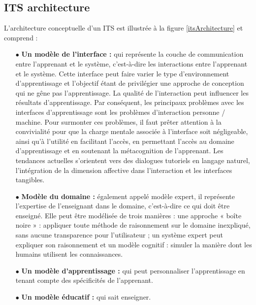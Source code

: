     \subsection{ITS architecture}
    L'architecture conceptuelle d'un ITS est illustrée à la figure \ref{itsArchitecture} et comprend : \cite{handbook_of_educational_data_mining}
    \begin{itemize}
		    \item[$\bullet$] \textbf{Un modèle de l'interface :} qui représente la couche de communication entre l'apprenant et le système, c'est-à-dire les interactions entre l'apprenant et le système. Cette interface peut faire varier le type d'environnement d'apprentissage et l'objectif étant de privilégier une approche de conception qui ne gêne pas l'apprentissage. La qualité de l'interaction peut influencer les résultats d'apprentissage. Par conséquent, les principaux problèmes avec les interfaces d'apprentissage sont les problèmes d'interaction personne / machine. Pour surmonter ces problèmes, il faut prêter attention à la convivialité pour que la charge mentale associée à l’interface soit négligeable, ainsi qu’à l’utilité en facilitant l’accès, en permettant l’accès au domaine d’apprentissage et en soutenant la métacognition de l’apprenant. Les tendances actuelles s'orientent vers des dialogues tutoriels en langage naturel, l'intégration de la dimension affective dans l'interaction et les interfaces tangibles.
		
		    \item[$\bullet$] \textbf{Modèle du domaine :} également appelé modèle expert, il représente l'expertise de l'enseignant dans le domaine, c'est-à-dire ce qui doit être enseigné. Elle peut être modélisée de trois manières : une approche « boîte noire » : appliquer toute méthode de raisonnement sur le domaine inexpliqué, sans aucune transparence pour l'utilisateur ; un système expert peut expliquer son raisonnement et un modèle cognitif : simuler la manière dont les humains utilisent les connaissances.
        
        \item[$\bullet$] \textbf{Un modèle d'apprentissage :} qui peut personnaliser l'apprentissage en tenant compte des spécificités de l'apprenant.
        
        \item[$\bullet$] \textbf{Un modèle éducatif :} qui sait enseigner.

    \end{itemize}
    
